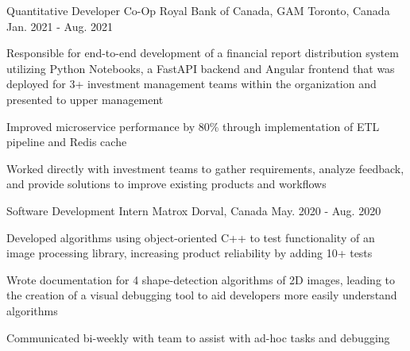 

\begin{cventries}

  \cventry
    {Quantitative Developer Co-Op} %
    {Royal Bank of Canada, GAM} %
    {Toronto, Canada} %
    {Jan. 2021 - Aug. 2021} %
    {
      \begin{cvitems} %
        \item {Responsible for end-to-end development of a financial report distribution system utilizing Python Notebooks, a FastAPI backend and Angular frontend that was deployed for 3+ investment management teams within the organization and presented to upper management}
        \item {Improved microservice performance by 80\% through implementation of ETL pipeline and Redis cache}
        \item {Worked directly with investment teams to gather requirements, analyze feedback, and provide solutions to improve existing products and workflows}
      \end{cvitems}
    }

  \cventry
    {Software Development Intern} %
    {Matrox} %
    {Dorval, Canada} %
    {May. 2020 - Aug. 2020} %
    {
      \begin{cvitems} %
        \item {Developed algorithms using object-oriented C++ to test functionality of an image processing library, increasing product reliability by adding 10+ tests}
        \item {Wrote documentation for 4 shape-detection algorithms of 2D images, leading to the creation of a visual debugging tool to aid developers more easily understand algorithms}
        \item {Communicated bi-weekly with team to assist with ad-hoc tasks and debugging }
      \end{cvitems}
    }


\end{cventries}
